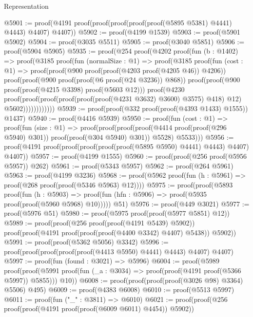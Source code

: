 \begin{lexlean}{Representation}
\begin{coremodule}
@5901 := proof(@4191 proof(proof(proof(proof(proof(@5895 @5381) @4441) @4443) @4407) @4407))
@5902 := proof(@4199 @1539)
@5903 := proof(@5901 @5902)
@5904 := proof(@3035 @5511)
@5905 := proof(@3040 @5851)
@5906 := proof(@5904 @5905)
@5935 := proof(@254
      proof(@4202
          proof(fun (b : @1402) =>
            proof(@3185
                proof(fun (normalSize : @1) =>
                  proof(@3185
                      proof(fun (cost : @1) =>
                        proof(proof(@900 proof(proof(@4203 proof(@4205 @46)) @4206))
                            proof(proof(@900 proof(proof(@6 proof(@24 @3236)) @868))
                                proof(proof(@900 proof(proof(@4215 @3398) proof(@5603 @12)))
                                    proof(@4230
                                        proof(proof(proof(proof(proof(proof(@4231 @3632) @3600)
                                                  @3575)
                                                @418)
                                              @12)
                                            @5602))))))))))))
@5939 := proof(proof(@332 proof(proof(@4393 @1433) @1555)) @1437)
@5940 := proof(@4416 @5939)
@5950 := proof(fun (cost : @1) =>
    proof(fun (size : @1) =>
      proof(proof(proof(proof(@4414 proof(proof(@296 @5940) @301)) proof(proof(@304 @5940) @301))
            @5528)
          @5533)))
@5956 := proof(@4191 proof(proof(proof(proof(proof(@5895 @5950) @4441) @4443) @4407) @4407))
@5957 := proof(@4199 @1555)
@5960 := proof(proof(@256 proof(@5956 @5957)) @262)
@5961 := proof(@5343 @5957)
@5962 := proof(@264 @5961)
@5963 := proof(@4199 @3236)
@5968 := proof(@5962 proof(fun (h : @5961) => proof(@268 proof(proof(@5346 @5963) @12))))
@5975 := proof(proof(@5893
        proof(fun (h : @5903) =>
          proof(fun (hfn : @5906) => proof(@5935 proof(proof(@5960 @5968) @10)))))
      @51)
@5976 := proof(@449 @3021)
@5977 := proof(@5976 @51)
@5980 := proof(@5975 proof(proof(@5977 @5851) @12))
@5989 := proof(proof(@256 proof(proof(@4191 @5439) @5902))
      proof(proof(@4191 proof(proof(proof(@4400 @3342) @4407) @5438)) @5902))
@5991 := proof(proof(@5362 @5056) @3342)
@5996 := proof(proof(proof(proof(proof(@4413 @5950) @4441) @4443) @4407) @4407)
@5997 := proof(fun (found : @3021) => @5996)
@6004 := proof(@5989
      proof(proof(@5991 proof(fun (_a : @3034) => proof(proof(@4191 proof(@5366 @5997)) @5855)))
          @10))
@6008 := proof(proof(proof(proof(@3026 @98) @3364) @5506) @495)
@6009 := proof(@4383 @6008)
@6010 := proof(@5513 @5997)
@6011 := proof(fun ("_" : @3811) => @6010)
@6021 := proof(proof(@256 proof(proof(@4191 proof(proof(@6009 @6011) @4454)) @5902))

\end{coremodule}
\end{lexlean}
